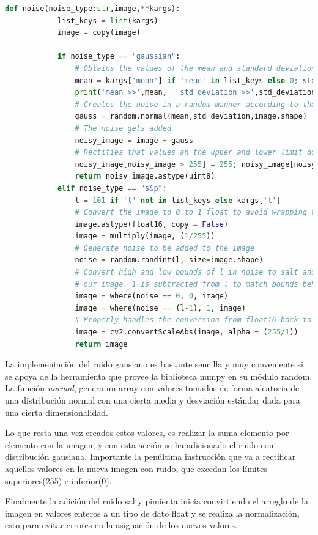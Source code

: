 	\begin{lstlisting}[language=Python]
		def noise(noise_type:str,image,**kargs):
			list_keys = list(kargs)
			image = copy(image)
			
			if noise_type == "gaussian":
				# Obtains the values of the mean and standard deviation
				mean = kargs['mean'] if 'mean' in list_keys else 0; std_deviation = kargs['std_deviation'] if 'std_deviation' in kargs.keys() else 0.1
				print('mean >>',mean,'  std deviation >>',std_deviation)
				# Creates the noise in a random manner according to the normal distribution with the given mean and standard deviation
				gauss = random.normal(mean,std_deviation,image.shape)
				# The noise gets added
				noisy_image = image + gauss
				# Rectifies that values an the upper and lower limit do not exceeds 0-255
				noisy_image[noisy_image > 255] = 255; noisy_image[noisy_image < 0] = 0
				return noisy_image.astype(uint8)
			elif noise_type == "s&p":
				l = 101 if 'l' not in list_keys else kargs['l']
				# Convert the image to 0 to 1 float to avoid wrapping that occurs with uint8
				image.astype(float16, copy = False)
				image = multiply(image, (1/255))
				# Generate noise to be added to the image
				noise = random.randint(l, size=image.shape)
				# Convert high and low bounds of l in noise to salt and pepper noise then add it to
				# our image. 1 is subtracted from l to match bounds behaviour of random.randint.
				image = where(noise == 0, 0, image)
				image = where(noise == (l-1), 1, image)
				# Properly handles the conversion from float16 back to uint8
				image = cv2.convertScaleAbs(image, alpha = (255/1))        
				return image
	\end{lstlisting}
	
	\hfill\break
	\justifying
	La implementación del ruido gausiano es bastante sencilla y muy conveniente si se apoya de la herramienta que provee la biblioteca numpy en su módulo random. La función \textit{normal}, genera un array con valores tomados de forma aleatoria de una distribución normal con una cierta media y desviación estándar dada para una cierta dimensionalidad.
	
	\hfill\break
	\justifying
	Lo que resta una vez creados estos valores, es realizar la suma elemento por elemento con la imagen, y con esta acción se ha adicionado el ruido con distribución gausiana. Importante la penúltima instrucción que va a rectificar aquellos valores en la nueva imagen con ruido, que excedan los límites superiores(255) e inferior(0).
	
	\hfill\break
	\justifying
	Finalmente la adición del ruido sal y pimienta inicia convirtiendo el arreglo de la imagen en valores enteros a un tipo de dato float y se realiza la normalización, esto para evitar errores en la asignación de los nuevos valores.
	
